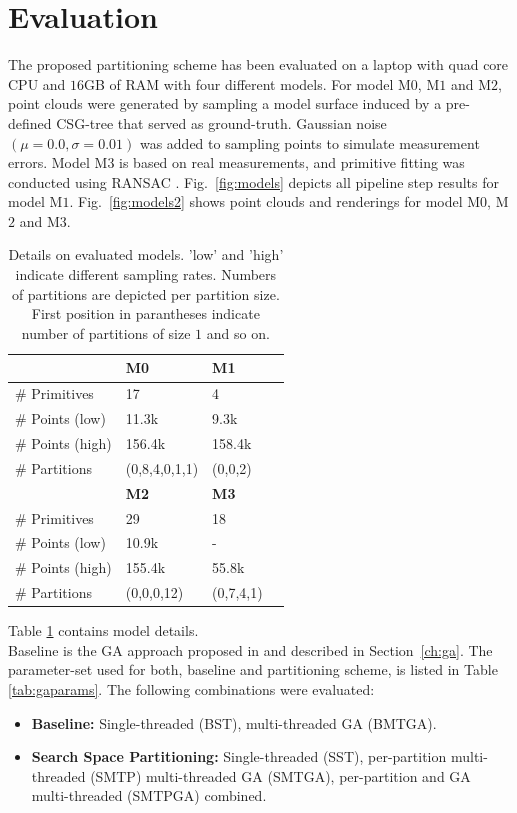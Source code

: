 \section{Evaluation}
\label{sec:eval}
The proposed partitioning scheme has been evaluated on a laptop with quad core CPU and $16$GB of RAM with four different models.
For model M$0$, M$1$ and M$2$, point clouds were generated by sampling a model surface induced by a pre-defined \ac{CSG}-tree that served as ground-truth. Gaussian noise $(\mu=0.0, \sigma=0.01)$ was added to sampling points to simulate measurement errors.
Model M$3$ is based on real measurements, and primitive fitting was conducted using RANSAC \cite{schnabel2007efficient}.
Fig.~\ref{fig:models} depicts all pipeline step results for model M$1$.
Fig.~\ref{fig:models2} shows point clouds and renderings for model M$0$, M$2$ and M$3$.
\begin{table}[h]
	\centering
	\begin{tabular}{|l|l|l|l|}
	\hline
	 & \textbf{M0} & \textbf{M1} \\
	\hline
	\# Primitives & 17 & 4  \\
	\hline
	\# Points (low) & 11.3k & 9.3k\\
	\hline
	\# Points (high) & 156.4k & 158.4k\\
	\hline
	\# Partitions & (0,8,4,0,1,1) & (0,0,2) \\
	\hline
	& \textbf{M2} & \textbf{M3} \\
	\hline
	\# Primitives & 29 & 18  \\
	\hline
	\# Points (low) & 10.9k & - \\
	\hline
	\# Points (high) & 155.4k & 55.8k \\
	\hline
	\# Partitions & (0,0,0,12) & (0,7,4,1) \\	
	\hline	
	\end{tabular}
	\caption{Details on evaluated models. 'low' and 'high' indicate different sampling rates. Numbers of partitions are depicted per partition size. First position in parantheses indicate number of partitions of size $1$ and so on.}
	\label{tab::models}
\end{table}
Table \ref{tab::models} contains model details.
\\
Baseline is the \ac{GA} approach proposed in \cite{fayolle2016evolutionary} and described in Section~\ref{ch:ga}. 
The parameter-set used for both, baseline and partitioning scheme, is listed in Table \ref{tab:gaparams}.
The following combinations were evaluated:
\begin{itemize}
	\item \textbf{Baseline:} Single-threaded (BST), multi-threaded \ac{GA} (BMTGA).
	\item \textbf{Search Space Partitioning:} Single-threaded (SST), per-partition multi-threaded (SMTP) multi-threaded \ac{GA} (SMTGA), per-partition and \ac{GA} multi-threaded (SMTPGA) combined.
\end{itemize}
